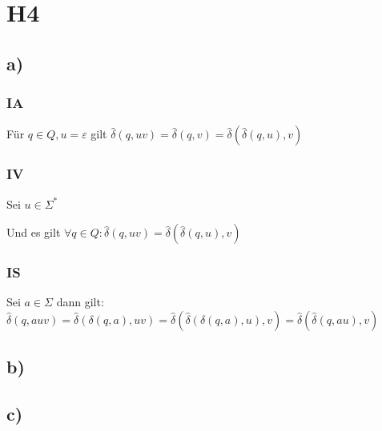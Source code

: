 \section*{H4}

\subsection*{a)}

	\subsubsection*{IA}
		Für $q \in Q, u = \varepsilon$ gilt $\hat{\delta}(q,uv) =  \hat{\delta}(q,v) = \hat{\delta}(\hat{\delta}(q,u),v)$ 

	\subsubsection*{IV}
	Sei $u \in \Sigma^*$
	
	Und es gilt 	
	$\forall q \in Q:\hat{\delta}(q,uv) =  \hat{\delta}(\hat{\delta}(q,u),v)$ 
	
	\subsubsection*{IS}
	
	Sei $a \in \Sigma$
	dann gilt:
	$\hat{\delta}(q,auv)
	= \hat{\delta}(\delta(q,a),uv)
	= \hat{\delta}(\hat{\delta}(\delta(q,a),u),v)
	= \hat{\delta}(\hat{\delta}(q,au),v)$ 
	  


\subsection*{b)}

\subsection*{c)}

